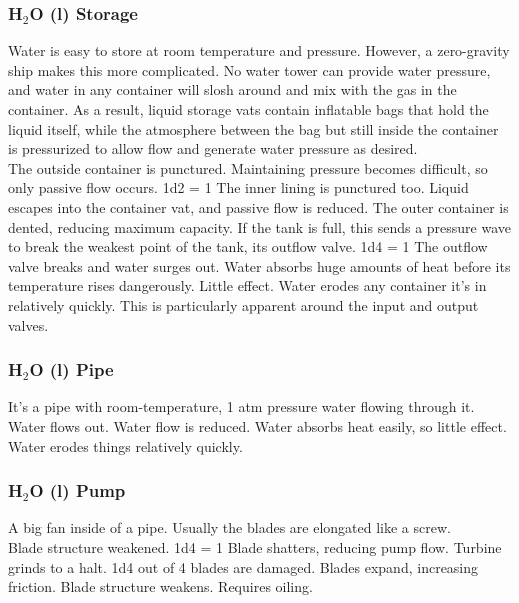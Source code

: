 \documentclass[a4paper]{article}
\begin{document}
\vspace{-0.5cm} \hspace{-18pt} \subsubsection{H$_2$O (l) Storage} \label{engine_h2o_storage} \vspace{-0.2cm} 
Water is easy to store at room temperature and pressure. However, a zero-gravity ship makes this more complicated. No water tower can provide water pressure, and water in any container will slosh around and mix with the gas in the container. As a result, liquid storage vats contain inflatable bags that hold the liquid itself, while the atmosphere between the bag but still inside the container is pressurized to allow flow and generate water pressure as desired.
\\ \pbhw
{The outside container is punctured. Maintaining pressure becomes difficult, so only passive flow occurs. \newline 1d2 = 1 The inner lining is punctured too. Liquid escapes into the container vat, and passive flow is reduced.}
{The outer container is dented, reducing maximum capacity. If the tank is full, this sends a pressure wave to break the weakest point of the tank, its outflow valve. 1d4 = 1 The outflow valve breaks and water surges out.}
{Water absorbs huge amounts of heat before its temperature rises dangerously. Little effect.}
{Water erodes any container it's in relatively quickly. This is particularly apparent around the input and output valves.}


\vspace{-0.5cm} \hspace{-18pt} \subsubsection{H$_2$O (l) Pipe} \label{engine_h2o_pipe} \vspace{-0.2cm}
It's a pipe with room-temperature, 1 atm pressure water flowing through it. 
\\ \pbhw
{Water flows out.}
{Water flow is reduced.}
{Water absorbs heat easily, so little effect.}
{Water erodes things relatively quickly.}


\vspace{-0.5cm} \hspace{-18pt} \subsubsection{H$_2$O (l) Pump} \label{engine_h2o_pump} \vspace{-0.2cm}
A big fan inside of a pipe. Usually the blades are elongated like a screw.
\\ \pbhw
{Blade structure weakened. 1d4 = 1 Blade shatters, reducing pump flow.}
{Turbine grinds to a halt. 1d4 out of 4 blades are damaged.}
{Blades expand, increasing friction. Blade structure weakens.}
{Requires oiling. }
\end{document}
